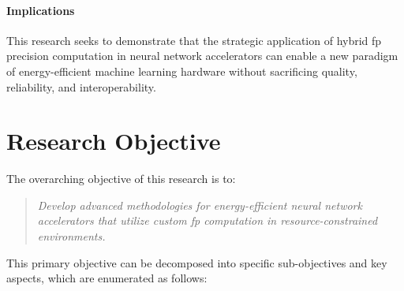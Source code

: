 \paragraph{Implications}
This research seeks to demonstrate that the strategic application of hybrid \gls{fp} precision computation in neural network accelerators can enable a new paradigm of energy-efficient machine learning hardware without sacrificing quality, reliability, and interoperability.



\section{Research Objective}

The overarching objective of this research is to:

\begin{quote}
	\textit{Develop advanced methodologies for energy-efficient neural network accelerators that utilize custom \gls{fp} computation in resource-constrained environments.}
\end{quote}

This primary objective can be decomposed into specific sub-objectives and key aspects, which are enumerated as follows:

